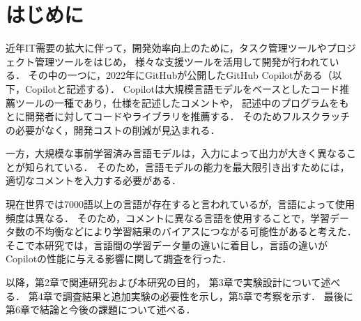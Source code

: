\section{はじめに\label{intro}}
    近年IT需要の拡大に伴って，開発効率向上のために，タスク管理ツールやプロジェクト管理ツールをはじめ，
    様々な支援ツールを活用して開発が行われている．
    その中の一つに，2022年にGitHubが公開したGitHub Copilotがある（以下，Copilotと記述する）．
    Copilotは大規模言語モデルをベースとしたコード推薦ツールの一種であり，仕様を記述したコメントや，
    記述中のプログラムをもとに開発者に対してコードやライブラリを推薦する．
    そのためフルスクラッチの必要がなく，開発コストの削減が見込まれる．

    一方，大規模な事前学習済み言語モデルは，入力によって出力が大きく異なることが知られている\cite{Yao2022ACL}．
    そのため，言語モデルの能力を最大限引き出すためには，適切なコメントを入力する必要がある．
    
    現在世界では7000語以上の言語が存在する\cite{Ethnologue}と言われているが，言語によって使用頻度は異なる．
    そのため，コメントに異なる言語を使用することで，学習データ数の不均衡などにより学習結果のバイアスにつながる可能性があると考えた．
    そこで本研究では，言語間の学習データ量の違いに着目し，言語の違いがCopilotの性能に与える影響に関して調査を行った．

    以降，第2章で関連研究および本研究の目的，
    第3章で実験設計について述べる．
    第4章で調査結果と追加実験の必要性を示し，第5章で考察を示す．
    最後に第6章で結論と今後の課題について述べる．
